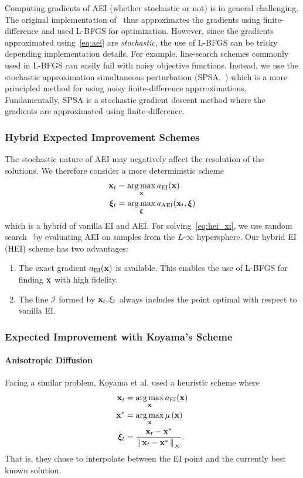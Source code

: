 Computing gradients of AEI (whether stochastic or not) is in general challenging.
The original implementation of~\cite{pmlr-v119-mikkola20a} thus approximates the gradients using finite-difference and used L-BFGS for optimization.
However, since the gradients approximated using~\cref{eq:aei} are \textit{stochastic}, the use of L-BFGS can be tricky depending implementation details.
For example, line-search schemes commonly used in L-BFGS can easily fail with noisy objective functions.
Instead, we use the stochastic approximation simultaneous perturbation (SPSA,~\cite{spall_overview_1998, spall_implementation_1998}) which is a more principled method for using noisy finite-difference apprroximations.
Fundamentally, SPSA is a stochastic gradient descent method where the gradients are approximated using finite-difference.

\subsubsection{Hybrid Expected Improvement Schemes}
The stochastic nature of AEI may negatively affect the resolution of the solutions.
We therefore consider a more deterministic scheme
\begin{align}
  \mathbf{x}_t  &= \operatorname*{arg\,max}_{\mathbf{x}}  a_{\mathrm{EI}}(\mathbf{x}) \\
  \bm{\xi}_t &= \operatorname*{arg\,max}_{\bm{\xi}} a_{\mathrm{AEI}}(\mathbf{x}_t, \bm{\xi}) \label{eq:hei_xi}
\end{align}
which is a hybrid of vanilla EI and AEI.
For solving~\cref{eq:hei_xi}, we use random search~\cite{karnopp_random_1963} by evaluating AEI on samples from the \(L\)-\(\infty\) hypersphere.
Our hybrid EI (HEI) scheme has two advantages:
\begin{enumerate}
\item The exact gradient \(a_{\mathrm{EI}}(\mathbf{x})\) is available.
  This enables the use of L-BFGS for finding \(\mathbf{x}\) with high fidelity.
\item The line \(\mathcal{I}\) formed by \(\mathbf{x}_t, \xi_t\) always includes the point optimal with respect to vanilla EI.
\end{enumerate}

\subsubsection{Expected Improvement with Koyama's Scheme}
\paragraph{Anisotropic Diffusion}
Facing a similar problem, Koyama et al. used a heuristic scheme where
\begin{align}
  \mathbf{x}_t   &= \operatorname*{arg\,max}_{\mathbf{x}} a_{\mathrm{EI}}(\mathbf{x}) \\
  \mathbf{x}^*   &= \operatorname*{arg\,max}_{\mathbf{x}} \mu\,(\mathbf{x}) \\
  \bm{\xi}_t  &=  \frac{\mathbf{x}_t - \mathbf{x}^*}{\left\lVert\,  \mathbf{x}_t - \mathbf{x}^*  \,\right\rVert_{\infty}}.
\end{align}
That is, they chose to interpolate between the EI point and the currently best known solution.

